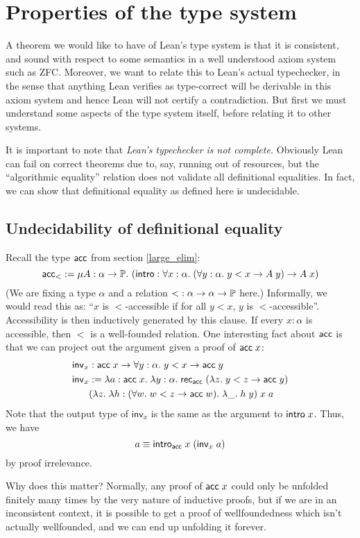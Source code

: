 \section{Properties of the type system}
A theorem we would like to have of Lean's type system is that it is consistent, and sound with respect to some semantics in a well understood axiom system such as ZFC. Moreover, we want to relate this to Lean's actual typechecker, in the sense that anything Lean verifies as type-correct will be derivable in this axiom system and hence Lean will not certify a contradiction. But first we must understand some aspects of the type system itself, before relating it to other systems.

It is important to note that \emph{Lean's typechecker is not complete.} Obviously Lean can fail on correct theorems due to, say, running out of resources, but the ``algorithmic equality'' relation does not validate all definitional equalities. In fact, we can show that definitional equality as defined here is undecidable.

\subsection{Undecidability of definitional equality}\label{undecidable}
Recall the type $\acc$ from section \ref{large_elim}:
$$\acc_{<}:=\mu A:\alpha\to\P.\ (\intro:\forall x:\alpha.\;(\forall y:\alpha.\;y<x\to A\;y)\to A\;x)$$
(We are fixing a type $\alpha$ and a relation ${<}:\alpha\to\alpha\to\P$ here.) Informally, we would read this as: ``$x$ is $<$-accessible if for all $y<x$, $y$ is $<$-accessible''. Accessibility is then inductively generated by this clause. If every $x:\alpha$ is accessible, then $<$ is a well-founded relation. One interesting fact about $\acc$ is that we can project out the argument given a proof of $\acc\;x$:
\begin{align*}
\mathsf{inv}_x&:\acc\;x\to\forall y:\alpha.\;y<x\to\acc\;y\\
\mathsf{inv}_x&:=\lambda a:\acc\;x.\;\lambda y:\alpha.\;\rec_{\acc}\;(\lambda z.\;y<z\to\acc\;y)\\
&(\lambda z.\;\lambda h:(\forall w.\;w<z\to\acc\;w).\;\lambda \_.\;h\;y)\;x\;a
\end{align*}
Note that the output type of $\mathsf{inv}_x$ is the same as the argument to $\intro\;x$. Thus, we have
$$a\equiv\intro_\acc\;x\;(\mathsf{inv}_x\;a)$$
by proof irrelevance.

Why does this matter? Normally, any proof of $\acc\;x$ could only be unfolded finitely many times by the very nature of inductive proofs, but if we are in an inconsistent context, it is possible to get a proof of wellfoundedness which isn't actually wellfounded, and we can end up unfolding it forever.

